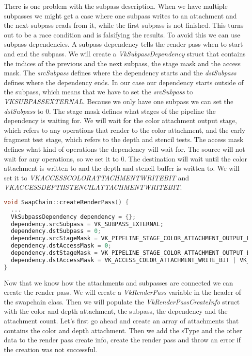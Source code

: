 \documentclass[12pt]{report} \usepackage{preamble}
\begin{document}
There is one problem with the subpass description. When we have multiple subpasses we might get a case where one subpass
writes to an attachment and the next subpass reads from it, while the first subpass is not finished. This turns out
to be a race condition and is falsifying the results. To avoid this we can use subpass dependencies. A subpass dependency
tells the render pass when to start and end the subpass. We will create a \textit{VkSubpassDependency} struct that contains
the indices of the previous and the next subpass, the stage mask and the access mask. The \textit{srcSubpass} defines
where the dependency starts and the \textit{dstSubpass} defines where the dependency ends. In our case our dependency
starts outside of the subpass, which means that we have to set the \textit{srcSubpass} to
\textit{VK\textunderscore SUBPASS\textunderscore EXTERNAL}. Because we only have one subpass we can set the
\textit{dstSubpass} to 0. The stage mask defines what stages of the pipeline the dependency is waiting for. We will
wait for the color attachment output stage, which refers to any operations that render to the color attachment, and
the early fragment test stage, which refers to the depth and stencil tests. The access mask defines what kind of
operations the dependency will wait for. The source will not wait for any operations, so we set it to 0. The destination
will wait until the color attachment is written to and the depth and stencil buffer is written to. We will set it to
\textit{VK\textunderscore ACCESS\textunderscore COLOR\textunderscore ATTACHMENT\textunderscore WRITE\textunderscore BIT}
and \textit{VK\textunderscore ACCESS\textunderscore DEPTH\textunderscore STENCIL\textunderscore ATTACHMENT\textunderscore WRITE\textunderscore BIT}.

\begin{lstlisting}[language=C++]
void SwapChain::createRenderPass() {
  ...
  VkSubpassDependency dependency = {};
  dependency.srcSubpass = VK_SUBPASS_EXTERNAL;
  dependency.dstSubpass = 0;
  dependency.srcStageMask = VK_PIPELINE_STAGE_COLOR_ATTACHMENT_OUTPUT_BIT | VK_PIPELINE_STAGE_EARLY_FRAGMENT_TESTS_BIT;
  dependency.dstAccessMask = 0;
  dependency.dstStageMask = VK_PIPELINE_STAGE_COLOR_ATTACHMENT_OUTPUT_BIT | VK_PIPELINE_STAGE_EARLY_FRAGMENT_TESTS_BIT;
  dependency.dstAccessMask = VK_ACCESS_COLOR_ATTACHMENT_WRITE_BIT | VK_ACCESS_DEPTH_STENCIL_ATTACHMENT_WRITE_BIT;
}
\end{lstlisting}

Now that we know how the attachments and subpasses are connected we can create the render pass. We will create a
\textit{VkRenderPass} variable in the header of the swapchain class. Then we will
populate the \textit{VkRenderPassCreateInfo} struct with the color and depth attachment, the subpass, the dependency
and the attachment count. Let's first go ahead and create an array of attachments that contains the color and depth
attachment. Then we add the sType and the other data to the render pass create info, create the render pass and
throw an error if the creation was not successful.
\end{document}
